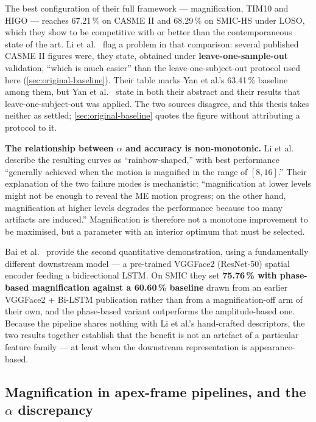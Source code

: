 The best configuration of their full framework --- magnification, TIM10 and HIGO --- reaches 67.21\,\% on CASME II and 68.29\,\% on SMIC-HS under LOSO, which they show to be competitive with or better than the contemporaneous state of the art. Li et al.~\cite{liX2018} flag a problem in that comparison: several published CASME II figures were, they state, obtained under \textbf{leave-one-sample-out} validation, ``which is much easier'' than the leave-one-subject-out protocol used here (\autoref{sec:original-baseline}). Their table marks Yan et al.'s 63.41\,\% baseline among them, but Yan et al.~\cite{yan2014} state in both their abstract and their results that leave-one-subject-out was applied. The two sources disagree, and this thesis takes neither as settled; \autoref{sec:original-baseline} quotes the figure without attributing a protocol to it.

\textbf{The relationship between $\alpha$ and accuracy is non-monotonic.} Li et al.~\cite{liX2018} describe the resulting curves as ``rainbow-shaped,'' with best performance ``generally achieved when the motion is magnified in the range of $[8, 16]$.'' Their explanation of the two failure modes is mechanistic: ``magnification at lower levels might not be enough to reveal the ME motion progress; on the other hand, magnification at higher levels degrades the performance because too many artifacts are induced.'' Magnification is therefore not a monotone improvement to be maximised, but a parameter with an interior optimum that must be selected.

Bai et al.~\cite{bai2021} provide the second quantitative demonstration, using a fundamentally different downstream model --- a pre-trained VGGFace2 (ResNet-50) spatial encoder feeding a bidirectional LSTM. On SMIC they set \textbf{75.76\,\% with phase-based magnification against a 60.60\,\% baseline} drawn from an earlier VGGFace2 + Bi-LSTM publication rather than from a magnification-off arm of their own, and the phase-based variant outperforms the amplitude-based one. Because the pipeline shares nothing with Li et al.'s hand-crafted descriptors, the two results together establish that the benefit is not an artefact of a particular feature family --- at least when the downstream representation is appearance-based.

\subsection{Magnification in apex-frame pipelines, and the $\alpha$ discrepancy}
\label{sec:evm-apex}

